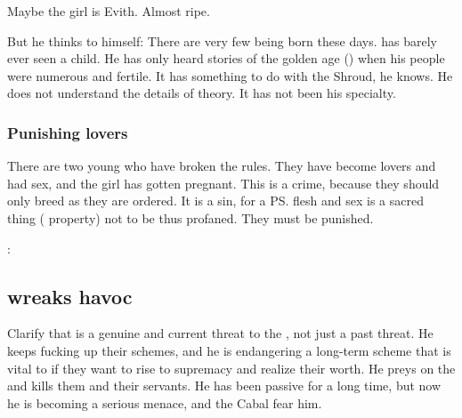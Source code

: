 
Maybe the girl is Evith. 
Almost ripe. 


But he thinks to himself: 
There are very few \resphain{} being born these days. 
\Teshrial{} has barely ever seen a \resphan{} child. 
He has only heard stories of the golden age () when his people were numerous and fertile. 
It has something to do with the Shroud, he knows. 
He does not understand the details of \dweomer{} theory. 
It has not been his specialty. 







\subsubsection{Punishing lovers}
There are two young \humans{} who have broken the rules. 
They have become lovers and had sex, and the girl has gotten pregnant. 
This is a crime, because they should only breed as they are ordered. 
It is a sin, for a \ps{\human} flesh and sex is a sacred thing (\resphan{} property) not to be thus profaned. 
They must be punished. 

\Teshrial: 









\subsection{\Ishnaruchaefir wreaks havoc}
Clarify that \Ishnaruchaefir is a genuine and current threat to the \resphain, not just a past threat.
He keeps fucking up their schemes, and he is endangering a long-term scheme that is vital to \CiriathSepher if they want to rise to supremacy and realize their worth.
He preys on the \resphain and kills them and their servants. 
He has been passive for a long time, but now he is becoming a serious menace, and the Cabal fear him.


